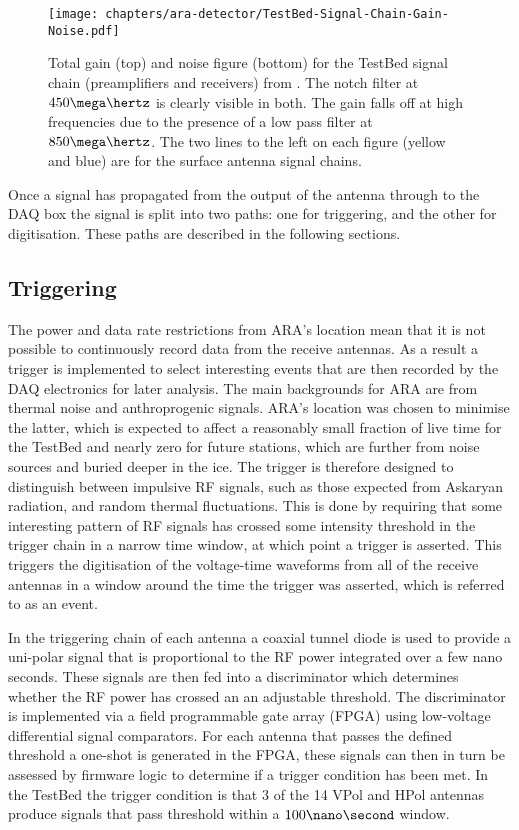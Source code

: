 \begin{figure}[htpb]
  \centering
  \texttt{[image: chapters/ara-detector/TestBed-Signal-Chain-Gain-Noise.pdf]}
  \caption{Total gain (top) and noise figure (bottom) for the TestBed signal chain (preamplifiers and receivers) from \cite{Allison2012457}. The notch filter at $450 \mega\hertz$ is clearly visible in both. The gain falls off at high frequencies due to the presence of a low pass filter at $850 \mega \hertz$. The two lines to the left on each figure (yellow and blue) are for the surface antenna signal chains.}
  \label{fig:ara-detector:TestBed:Signal-Chain:Gain-Noise}
\end{figure}

Once a signal has propagated from the output of the antenna through to the DAQ box the signal is split into two paths: one for triggering, and the other for digitisation. These paths are described in the following sections.

\subsection{Triggering}
\label{sec:ara-detector:TestBed:Triggering}

The power and data rate restrictions from ARA's location mean that it is not possible to continuously record data from the receive antennas. As a result a trigger is implemented to select interesting events that are then recorded by the DAQ electronics for later analysis. The main backgrounds for ARA are from thermal noise and anthroprogenic signals. ARA's location was chosen to minimise the latter, which is expected to affect a reasonably small fraction of live time for the TestBed and nearly zero for future stations, which are further from noise sources and buried deeper in the ice. The trigger is therefore designed to distinguish between impulsive RF signals, such as those expected from Askaryan radiation, and random thermal fluctuations. This is done by requiring that some interesting pattern of RF signals has crossed some intensity threshold in the trigger chain in a narrow time window, at which point a trigger is asserted. This triggers the digitisation of the voltage-time waveforms from all of the receive antennas in a window around the time the trigger was asserted, which is referred to as an event.

In the triggering chain of each antenna a coaxial tunnel diode is used to provide a uni-polar signal that is proportional to the RF power integrated over a few nano seconds. These signals are then fed into a discriminator which determines whether the RF power has crossed an an adjustable threshold. The discriminator is implemented via a field programmable gate array (FPGA) using low-voltage differential signal comparators. For each antenna that passes the defined threshold a one-shot is generated in the FPGA, these signals can then in turn be assessed by firmware logic to determine if a trigger condition has been met. In the TestBed the trigger condition is that 3 of the 14 VPol and HPol antennas produce signals that pass threshold within a $100 \nano\second$ window. 

